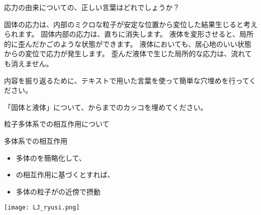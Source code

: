 \documentclass[uplatex,dvipdfmx,a4paper,11pt]{jsarticle}
\begin{document}
\begin{qlist}
	\qitem 応力の由来についての、正しい言葉はどれでしょうか？
		\begin{qlist2}
			\qitem 固体の応力は、内部のミクロな粒子が安定な位置から変位した結果生じると考えられます。
			\qitem 固体内部の応力は、直ちに消失します。
			\qitem 液体を変形させると、局所的に歪んだかごのような状態ができます。
			\qitem 液体においても、居心地のいい状態からの変位で応力が発生します。
			\qitem 歪んだ液体で生じた局所的な応力は、流れても消えません。
		\end{qlist2}	
\end{qlist}

内容を振り返るために、テキストで用いた言葉を使って簡単な穴埋めを行ってください。
\begin{qlist}
	\qitem 「固体と液体」について、からまでのカッコを埋めてください。
		\begin{qlist2}
			\qitem 粒子多体系での相互作用について
				\begin{center}
					\begin{minipage}{0.52\textwidth}
						\begin{itembox}[l]{多体系での相互作用}
							\begin{itemize}
								\item 多体の\qbox{}を簡略化して、
								\item \qbox{}の相互作用に基づくとすれば、
								\item 多体の粒子が\qbox{}の近傍で摂動
							\end{itemize}
						\end{itembox}
					\end{minipage}
					\begin{minipage}{0.32\textwidth}
						\begin{center}
						\texttt{[image: LJ\_ryusi.png]}
						\end{center}
					\end{minipage}
			\end{center}


\end{qlist2}
\end{qlist}
\end{document}
